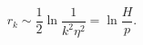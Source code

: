 \begin{equation}
r_{k}\sim \frac{1}{2}\ln \frac{1}{k^{2}\eta ^{2}}=\ln \frac{H}{p}.
\end{equation}

